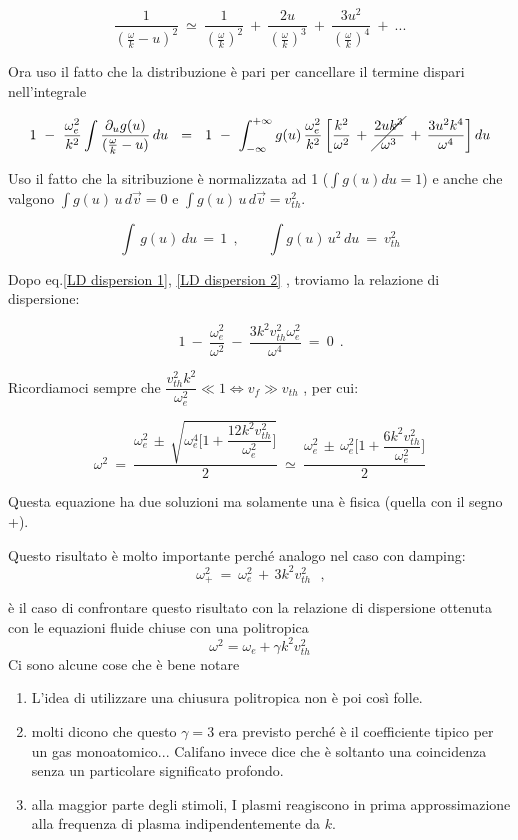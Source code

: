 \[\frac{1}{(\frac{\omega}{k}-u)^2}\ \simeq\ 
 \frac{1}{(\frac{\omega}{k})^2}\ +\ \frac{2u}{(\frac{\omega}{k})^3}\ +\ \frac{3u^2}{(\frac{\omega}{k})^4}\ +\ ...\]

Ora uso il fatto che la distribuzione è pari per cancellare il termine dispari nell'integrale 

\[1\ -\ \frac{\omega_e^2}{k^2} \int \frac{\partial_ug(u)}{(\frac{\omega}{k}-u)}\,du\ \ =\ \ 1\ -\  \int_{-\infty}^{+\infty} g(u)\, \frac{\omega_e^2}{k^2} \, \bigg[\frac{k^2}{\omega^2}\,+\,\cancel{\frac{2uk^3}{\omega^3}}\,+\,\frac{3u^2k^4}{\omega^4}\bigg]\, du \]  

Uso il fatto che la sitribuzione è normalizzata ad 1 ($\int g(u)du=1$) e anche che valgono $\int g(u)\, u\,d\vec v=0$ e $\int g(u)\, u\,d\vec v=v^2_{th}$.

\[\int\, g(u)\,du\,=\,1\ \ ,\qquad \int g(u)\,u^2\,du\ =\ v_{th}^2\] 

Dopo eq.\ref{LD dispersion 1}, \ref{LD dispersion 2} , troviamo la relazione di dispersione: 

\[\boxed{\,1\ -\ \frac{\omega_e^2}{\omega^2}\ -\ \frac{3k^2v^2_{th}\omega_e^2}{\omega^4}\ =\ 0}\ \ .\]

Ricordiamoci sempre che  $\dfrac{v_{th}^2 k^2}{\omega_e^2}\ll1\iff v_f\gg v_{th}$ , per cui:

\[\omega^2\ =\ \frac{\omega_e^2\,\pm\, \sqrt{\omega_e^4\bigg[1+\dfrac{12k^2v_{th}^2}{\omega_e^2}\bigg]}}{2}\ \simeq\ \frac{\omega^2_e\, \pm\, \omega_e^2\bigg[1+\dfrac{6k^2v_{th}^2}{\omega_e^2}\bigg]}{2}\]

Questa equazione ha due soluzioni ma solamente una è fisica (quella con il segno +).
 
Questo risultato è molto importante perché analogo nel caso con damping:
\[\boxed{\ \omega_+^2\ =\ \omega_e^2\, +\, 3 k^2 v_{th}^2\ }\ \ ,\]

è il caso di confrontare questo risultato con la relazione di dispersione ottenuta con le equazioni fluide chiuse con una politropica 
\[\omega^2=\omega_e+\gamma k^2 v_{th}^2\]
Ci sono alcune cose che è bene notare \begin{enumerate}
	\item L'idea di utilizzare una chiusura politropica non è poi così folle. 
	\item molti dicono che questo $\gamma=3$ era previsto perché è il coefficiente tipico per un gas monoatomico... Califano invece dice che è soltanto una coincidenza senza un particolare significato profondo.
	\item  alla maggior parte degli stimoli, I plasmi reagiscono in prima approssimazione alla frequenza di plasma indipendentemente da $k$. 
\end{enumerate} 



